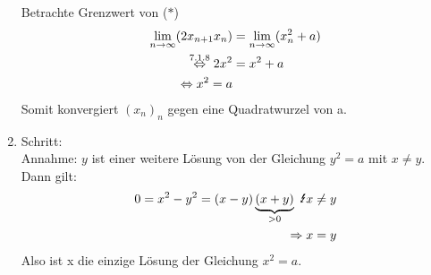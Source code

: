 \documentclass[../ana1u.tex]{subfiles}
\begin{document}
\begin{bsp}
\begin{bew}
\begin{enumerate}
                Betrachte Grenzwert von (\(\ast\))
                \begin{align*}
                    \lim\limits_{n\rightarrow\infty} (2x_{n+1}x_n) &= \lim\limits_{n\rightarrow\infty} (x_n^2 + a)\\
                    \overset{\text{7.1.8}}{\Leftrightarrow} 2x^2 &= x^2 + a\\
                    \Leftrightarrow x^2 = a						
                \end{align*}
                Somit konvergiert \((x_n)_n\) gegen eine Quadratwurzel von a.
            \item Schritt:\\
                Annahme: \(y\) ist einer weitere Lösung von der Gleichung \(y^2 = a\) mit \(x \neq y\).\\
                Dann gilt:
                \begin{align*}
                    0 = x^2 - y^2 = (x-y)\underbrace{(x+y)}_{>0} \text{ \Lightning} x \neq y\\
                    \Rightarrow x = y
                \end{align*}
                Also ist x die einzige Lösung der Gleichung \(x^2 = a\).
        \end{enumerate}
    \end{bew}

\end{bsp}
\end{document}

